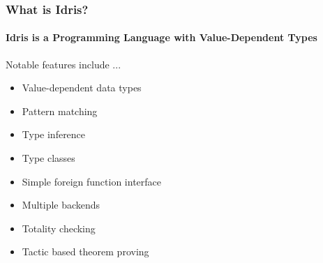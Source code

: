 \begin{frame}
\frametitle{What is Idris?}
\framesubtitle{Idris is a Programming Language with Value-Dependent Types}


Notable features include ...

\begin{itemize}
\item Value-dependent data types
\item Pattern matching
\item Type inference
\item Type classes
\item Simple foreign function interface
\item Multiple backends %
\item Totality checking
\item Tactic based theorem proving
\end{itemize}

\end{frame}
